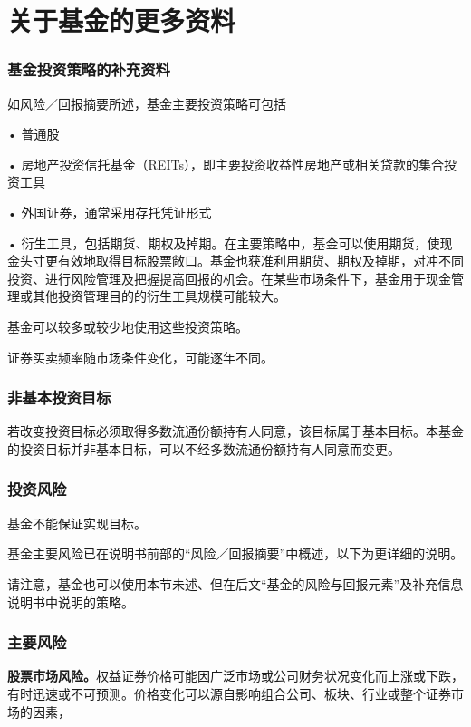 \documentclass[UTF8,fontset=none,11pt,a4paper]{ctexart}
\begin{document}
\par{}\label{originalpage4}
\section*{关于基金的更多资料}\label{unitU240}
\subsubsection*{基金投资策略的补充资料}\label{unitU241}
如风险／回报摘要所述，基金主要投资策略可包括

\noindent • 普通股\par\smallskip
\noindent • 房地产投资信托基金（REITs），即主要投资收益性房地产或相关贷款的集合投资工具\par\smallskip
\noindent • 外国证券，通常采用存托凭证形式\par\smallskip
\noindent • 衍生工具，包括期货、期权及掉期。在主要策略中，基金可以使用期货，使现金头寸更有效地取得目标股票敞口。基金也获准利用期货、期权及掉期，对冲不同投资、进行风险管理及把握提高回报的机会。在某些市场条件下，基金用于现金管理或其他投资管理目的的衍生工具规模可能较大。\par\smallskip
基金可以较多或较少地使用这些投资策略。

证券买卖频率随市场条件变化，可能逐年不同。

\subsubsection*{非基本投资目标}
若改变投资目标必须取得多数流通份额持有人同意，该目标属于基本目标。本基金的投资目标并非基本目标，可以不经多数流通份额持有人同意而变更。


\subsubsection*{投资风险}\label{unitU255}
基金不能保证实现目标。

基金主要风险已在说明书前部的“风险／回报摘要”中概述，以下为更详细的说明。

请注意，基金也可以使用本节未述、但在后文“基金的风险与回报元素”及补充信息说明书中说明的策略。

\subsubsection*{主要风险}
\textbf{股票市场风险。}权益证券价格可能因广泛市场或公司财务状况变化而上涨或下跌，有时迅速或不可预测。价格变化可以源自影响组合公司、板块、行业或整个证券市场的因素，
\end{document}
